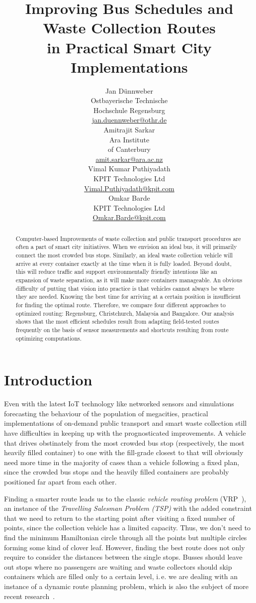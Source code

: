 \documentclass[10pt]{article}
\title{Improving Bus Schedules and Waste Collection Routes \\ in Practical Smart City Implementations}
\author{
  Jan D{\"u}nnweber  \\
  Ostbayerische Technische \\ Hochschule Regensburg \\
  {\underline{ jan.duennweber@othr.de} }\\\And 
  Amitrajit Sarkar \\
 Ara Institute \\ of Canterbury \\
  {\underline{amit.sarkar@ara.ac.nz}} \\\And
  Vimal Kumar Puthiyadath \\
 KPIT Technologies Ltd \\
  {\underline{Vimal.Puthiyadath@kpit.com}} \\\And
  Omkar Barde \\
 KPIT Technologies Ltd \\
  {\underline{Omkar.Barde@kpit.com}} 
 }
\date{}
\begin{document}
\maketitle
\begin{abstract}
Computer-based Improvements of waste collection and public transport procedures are 
often a part of smart city initiatives. When we envision an ideal bus, it will 
primarily connect the most crowded bus stops. Similarly, an ideal waste collection 
vehicle will arrive at every container exactly at the time when it is fully loaded. 
Beyond doubt, this will
reduce traffic and support environmentally friendly intentions like an expansion
of waste separation, as it will make more containers manageable.
An obvious difficulty of putting that vision into practice is that
vehicles cannot always be where they are needed.           
Knowing the best time for arriving at a certain position is insufficient for 
finding the optimal route.
Therefore, we compare four different approaches to optimized routing: 
Regensburg, Christchurch, Malaysia and Bangalore. Our analysis shows 
that the most efficient schedules           
result from adapting field-tested routes frequently on the basis of
sensor measurements and shortcuts resulting from route        
optimizing computations.
\end{abstract}

\section{Introduction}
Even with the latest IoT technology like networked sensors and simulations
forecasting the behaviour of the population of megacities, practical implementations 
of on-demand public transport and smart waste collection still have difficulties 
in keeping up with the prognosticated improvements.
A vehicle that drives obstinately from the most crowded bus stop (respectively, the 
most heavily filled container) to one with the fill-grade closest 
to that will obviously need more time in the majority of cases than a vehicle 
following a fixed plan, 
since the crowded bus stops and the heavily filled containers are probably 
positioned far apart from 
each other. 

Finding a smarter route leads us to the classic 
{\it vehicle routing problem} (VRP~\cite{Dantzig59}), an instance of the 
{\it Travelling Salesman Problem (TSP)} with the added constraint that we 
need to return to the starting point after visiting a fixed number of points, 
since the collection vehicle has a limited capacity. 
Thus, we don't need to find the minimum Hamiltonian
circle through all the points but multiple circles forming some kind of
clover leaf. However, finding the best route does not only require to consider the distances between the single stops. Busses should leave out stops where no
passengers are waiting and waste collectors should skip containers which are filled only 
to a certain level, i.\,e. we are dealing with an instance of a dynamic route 
planning problem, which is also the subject of more recent 
research~\cite{Chen16}.
\end{document}
